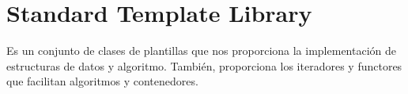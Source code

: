\chapter{Standard Template Library}

Es un conjunto de clases de plantillas que nos proporciona la implementación de estructuras de datos y
algoritmo. También, proporciona los iteradores y functores que facilitan algoritmos y contenedores.





